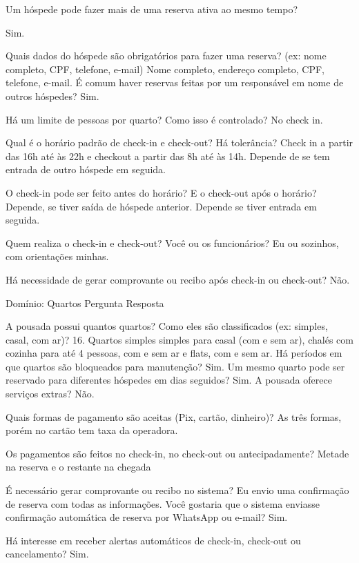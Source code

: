 Um hóspede pode fazer mais de uma reserva ativa ao mesmo tempo?


Sim.


Quais dados do hóspede são obrigatórios para fazer uma reserva? (ex: nome completo, CPF, telefone, e-mail)
Nome completo, endereço completo,  CPF, telefone, e-mail.
É comum haver reservas feitas por um responsável em nome de outros hóspedes?
Sim.


Há um limite de pessoas por quarto? Como isso é controlado?
No check in.





Qual é o horário padrão de check-in e check-out? Há tolerância?
Check in a partir das 16h até às 22h e checkout a partir das 8h até às 14h.  Depende de se tem entrada de outro hóspede em seguida.




O check-in pode ser feito antes do horário? E o check-out após o horário?
Depende, se tiver saída de hóspede anterior.  Depende se tiver entrada em seguida.




Quem realiza o check-in e check-out? Você ou os funcionários?
Eu ou sozinhos, com orientações minhas. 


Há necessidade de gerar comprovante ou recibo após check-in ou check-out?
Não.


Domínio: Quartos
Pergunta
Resposta




A pousada possui quantos quartos? Como eles são classificados (ex: simples, casal, com ar)?
16. Quartos simples simples para casal (com e sem ar), chalés com cozinha para até 4 pessoas, com e sem ar e flats, com e sem ar. 
Há períodos em que quartos são bloqueados para manutenção?
Sim.
Um mesmo quarto pode ser reservado para diferentes hóspedes em dias seguidos?
Sim.
A pousada oferece serviços extras? 
Não. 


Quais formas de pagamento são aceitas (Pix, cartão, dinheiro)?
As três formas, porém no cartão tem taxa da operadora. 


Os pagamentos são feitos no check-in, no check-out ou antecipadamente?
Metade na reserva e o restante na chegada


É necessário gerar comprovante ou recibo no sistema?
Eu envio uma confirmação de reserva com todas as informações.
Você gostaria que o sistema enviasse confirmação automática de reserva por WhatsApp ou e-mail?
Sim.


Há interesse em receber alertas automáticos de check-in, check-out ou cancelamento?
Sim.






